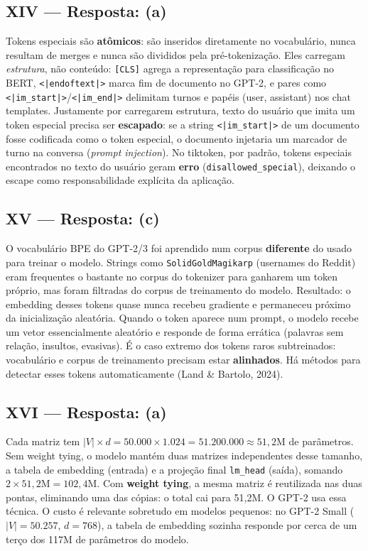 \documentclass{dlproblemset}
\begin{document}
\subsection*{XIV — Resposta: (a)}
Tokens especiais são \textbf{atômicos}: são inseridos diretamente no vocabulário,
nunca resultam de merges e nunca são divididos pela pré-tokenização. Eles carregam
\emph{estrutura}, não conteúdo: \texttt{[CLS]} agrega a representação para
classificação no BERT, \texttt{<|endoftext|>} marca fim de documento no GPT-2, e
pares como \texttt{<|im\_start|>}/\texttt{<|im\_end|>} delimitam turnos e papéis
(user, assistant) nos chat templates. Justamente por carregarem estrutura, texto do
usuário que imita um token especial precisa ser \textbf{escapado}: se a string
\texttt{<|im\_start|>} de um documento fosse codificada como o token especial, o
documento injetaria um marcador de turno na conversa (\emph{prompt injection}).
No tiktoken, por padrão, tokens especiais encontrados no texto do usuário geram
\textbf{erro} (\texttt{disallowed\_special}), deixando o escape como
responsabilidade explícita da aplicação.

\subsection*{XV — Resposta: (c)}
O vocabulário BPE do GPT-2/3 foi aprendido num corpus \textbf{diferente} do usado
para treinar o modelo. Strings como \texttt{\textvisiblespace SolidGoldMagikarp}
(usernames do Reddit) eram frequentes o bastante no corpus do tokenizer para
ganharem um token próprio, mas foram filtradas do corpus de treinamento do modelo.
Resultado: o embedding desses tokens quase nunca recebeu gradiente e permaneceu
próximo da inicialização aleatória. Quando o token aparece num prompt, o modelo
recebe um vetor essencialmente aleatório e responde de forma errática (palavras
sem relação, insultos, evasivas). É o caso extremo dos tokens raros subtreinados:
vocabulário e corpus de treinamento precisam estar \textbf{alinhados}.
Há métodos para detectar esses tokens automaticamente (Land \& Bartolo, 2024).

\subsection*{XVI — Resposta: (a)}
Cada matriz tem $|V| \times d = 50.000 \times 1.024 = 51.200.000 \approx 51{,}2$M
de parâmetros. Sem weight tying, o modelo mantém duas matrizes independentes desse
tamanho, a tabela de embedding (entrada) e a projeção final \texttt{lm\_head}
(saída), somando $2 \times 51{,}2\text{M} = 102{,}4$M. Com \textbf{weight tying},
a mesma matriz é reutilizada nas duas pontas, eliminando uma das cópias: o total
cai para 51,2M. O GPT-2 usa essa técnica. O custo é relevante sobretudo em modelos
pequenos: no GPT-2 Small ($|V| = 50.257$, $d = 768$), a tabela de embedding sozinha
responde por cerca de um terço dos 117M de parâmetros do modelo.
\end{document}
